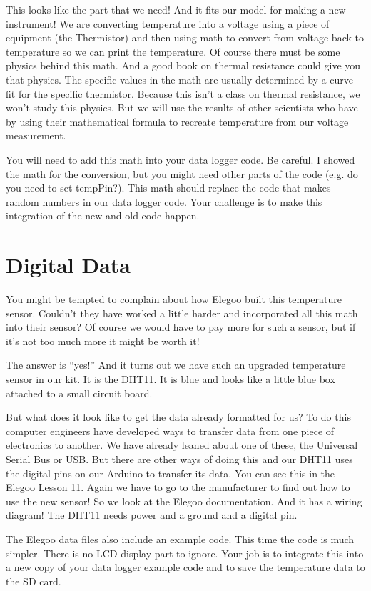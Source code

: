 This looks like the part that we need! And it fits our model for making a new instrument! We are converting temperature into a voltage using a piece of equipment (the Thermistor) and then using math to convert from voltage back to temperature so we can print the temperature. Of course there must be some physics behind this math. And a good book on thermal resistance could give you that physics. The specific values in the math are usually determined by a curve fit for the specific thermistor.  Because this isn't a class on thermal resistance, we won't study this physics. But we will use the results of other scientists who have by using their mathematical formula to recreate temperature from our voltage measurement.

You will need to add this math into your data logger code.  Be careful.  I showed the math for the conversion, but you might need other parts of the code (e.g. do you need to set tempPin?). This math should replace the code that makes random numbers in our data logger code.  Your challenge is to make this integration of the new and old code happen.

\section{Digital Data}
You might be tempted to complain about how Elegoo built this temperature sensor.  Couldn't they have worked a little harder and incorporated all this math into their sensor?  Of course we would have to pay more for such a sensor, but if it's not too much more it might be worth it!  

The answer is ``yes!'' And it turns out we have such an upgraded temperature sensor in our kit.  It is the DHT11.  It is blue and looks like a little blue box attached to a small circuit board.  

But what does it look like to get the data already formatted for us?  To do this computer engineers have developed ways to transfer data from one piece of electronics to another. We have already leaned about one of these, the Universal Serial Bus or USB.  But there are other ways of doing this and our DHT11 uses the digital pins on our Arduino to transfer its data. You can see this in the Elegoo Lesson 11. Again we have to go to the manufacturer to find out how to use the new sensor!  So we look at the Elegoo documentation. And it has a wiring diagram! The DHT11 needs power and a ground and a digital pin.

The Elegoo data files also include an example code. This time the code is much simpler. There is no LCD display part to ignore.  Your job is to integrate this into a new copy of your data logger example code and to save the temperature data to the SD card.

